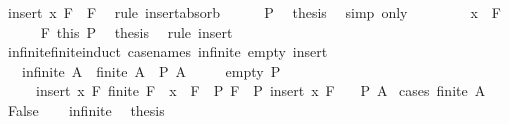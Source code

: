 \begin{isabellebody}
\ {\isachardoublequoteopen}insert\ x\ F\ {\isacharequal}{\kern0pt}\ F{\isachardoublequoteclose}\ \isamarkupfalse%
\ {\isacharparenleft}{\kern0pt}rule\ insert{\isacharunderscore}{\kern0pt}absorb{\isacharparenright}{\kern0pt}\isanewline
\ \ \ \ \isamarkupfalse%
\ P\ \isamarkupfalse%
\ {\isacharquery}{\kern0pt}thesis\ \isamarkupfalse%
\ {\isacharparenleft}{\kern0pt}simp\ only{\isacharcolon}{\kern0pt}{\isacharparenright}{\kern0pt}\isanewline
\ \ \isamarkupfalse%
\isanewline
\ \ \ \ \isamarkupfalse%
\ {\isachardoublequoteopen}x\ {\isasymnotin}\ F{\isachardoublequoteclose}\isanewline
\ \ \ \ \isamarkupfalse%
\ F\ this\ P\ \isamarkupfalse%
\ {\isacharquery}{\kern0pt}thesis\ \isamarkupfalse%
\ {\isacharparenleft}{\kern0pt}rule\ insert{\isacharparenright}{\kern0pt}\isanewline
\ \ \isamarkupfalse%
\isanewline
{}\isamarkupfalse%
%
\endisatagproof
{\isafoldproof}%
%
\isadelimproof
\isanewline
%
\endisadelimproof
\isanewline
{}\isamarkupfalse%
\ infinite{\isacharunderscore}{\kern0pt}finite{\isacharunderscore}{\kern0pt}induct\ {\isacharbrackleft}{\kern0pt}case{\isacharunderscore}{\kern0pt}names\ infinite\ empty\ insert{\isacharbrackright}{\kern0pt}{\isacharcolon}{\kern0pt}\isanewline
\ \ \ infinite{\isacharcolon}{\kern0pt}\ {\isachardoublequoteopen}{\isasymAnd}A{\isachardot}{\kern0pt}\ {\isasymnot}\ finite\ A\ {\isasymLongrightarrow}\ P\ A{\isachardoublequoteclose}\isanewline
\ \ \ \ \ empty{\isacharcolon}{\kern0pt}\ {\isachardoublequoteopen}P\ {\isacharbraceleft}{\kern0pt}{\isacharbraceright}{\kern0pt}{\isachardoublequoteclose}\isanewline
\ \ \ \ \ insert{\isacharcolon}{\kern0pt}\ {\isachardoublequoteopen}{\isasymAnd}x\ F{\isachardot}{\kern0pt}\ finite\ F\ {\isasymLongrightarrow}\ x\ {\isasymnotin}\ F\ {\isasymLongrightarrow}\ P\ F\ {\isasymLongrightarrow}\ P\ {\isacharparenleft}{\kern0pt}insert\ x\ F{\isacharparenright}{\kern0pt}{\isachardoublequoteclose}\isanewline
\ \ \ {\isachardoublequoteopen}P\ A{\isachardoublequoteclose}\isanewline
%
\isadelimproof
%
\endisadelimproof
%
\isatagproof
{}\isamarkupfalse%
\ {\isacharparenleft}{\kern0pt}cases\ {\isachardoublequoteopen}finite\ A{\isachardoublequoteclose}{\isacharparenright}{\kern0pt}\isanewline
\ \ \isamarkupfalse%
\ False\isanewline
\ \ \isamarkupfalse%
\ infinite\ \isamarkupfalse%
\ {\isacharquery}{\kern0pt}thesis\ \isacommand{{\isachardot}{\kern0pt}}\isamarkupfalse%

\end{isabellebody}
